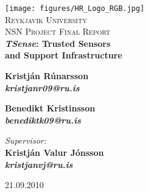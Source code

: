 \documentclass[10pt,titlepage,twoside,a4paper]{report}
\begin{document}
\begin{titlepage}

\begin{center}


\texttt{[image: figures/HR\_Logo\_RGB.jpg]}\\[1cm]    

\textsc{\LARGE Reykjavik University}\\[4cm]

\textsc{\Large NSN Project Final Report}\\[0.6cm]

{ \huge \bfseries \textit{TSense}: Trusted Sensors\\[0.3cm] and Support Infrastructure}\\[2cm]

\begin{minipage}{0.4\textwidth}
\begin{flushleft} 
\begin{center}
{\bfseries{\large{Kristj\'{a}n R\'{u}narsson}} \\ \small{\textit{kristjanr09@ru.is}} }
\end{center}
\end{flushleft}
\end{minipage}
\begin{minipage}{0.4\textwidth}
\begin{flushright} 
\begin{center}
{\bfseries{\large{Benedikt Kristinsson}} \\ \small{\textit{benediktk09@ru.is}} }
\end{center}
\end{flushright}
\end{minipage}

\vspace{1.5cm}

\begin{center}
{\large \emph{Supervisor:} \\ \bfseries{\large Kristj\'{a}n Valur J\'{o}nsson} \\ \small{\textit{kristjanvj@ru.is}}}
\end{center}


\vfill

{\large 21.09.2010}

\end{center}

\end{titlepage}
\end{document}
